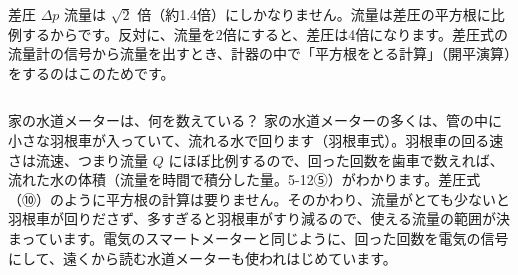 \begin{phbaisuru}{差圧 $\Delta p$}
流量は $\sqrt2$ 倍（約1.4倍）にしかなりません。流量は差圧の平方根に比例するからです。反対に、流量を2倍にすると、差圧は4倍になります。差圧式の流量計の信号から流量を出すとき、計器の中で「平方根をとる計算」（開平演算）をするのはこのためです。
\end{phbaisuru}

\begin{column}{家の水道メーターは、何を数えている？}
家の水道メーターの多くは、管の中に小さな羽根車が入っていて、流れる水で回ります（羽根車式）。羽根車の回る速さは流速、つまり流量 $Q$ にほぼ比例するので、回った回数を歯車で数えれば、流れた水の体積（流量を時間で積分した量。5-12⑤）がわかります。差圧式（⑩）のように平方根の計算は要りません。そのかわり、流量がとても少ないと羽根車が回りださず、多すぎると羽根車がすり減るので、使える流量の範囲が決まっています。電気のスマートメーターと同じように、回った回数を電気の信号にして、遠くから読む水道メーターも使われはじめています。
\end{column}


